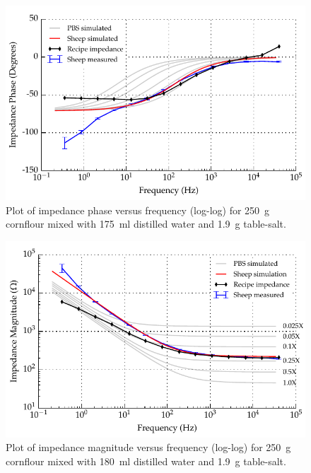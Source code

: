 \begin{figure}
    \centering
    \includegraphics[width=\textwidth]{content/pt2/graphics/run14_175ml-distilledWater_250g-cornflour_1g9-salt_ZVsF_graph_phase}
    \caption{\label{fig:recipe_cornflour_salt_phase}Plot of impedance phase versus frequency (log-log) for \SI{250}{\gram} cornflour mixed with \SI{175}{\milli\litre} distilled water and \SI{1.9}{\gram} table-salt.}
\end{figure}

\begin{figure}
    \centering
    \includegraphics[width=\textwidth]{content/pt2/graphics/run14_180ml-distilledWater_250g-cornflour_1g9-salt_ZVsF_graph_mag}
    \caption{\label{fig:recipe_cornflour_salt_extraWater_mag}Plot of impedance magnitude versus frequency (log-log) for \SI{250}{\gram} cornflour mixed with \SI{180}{\milli\litre} distilled water and \SI{1.9}{\gram} table-salt.}
\end{figure}

